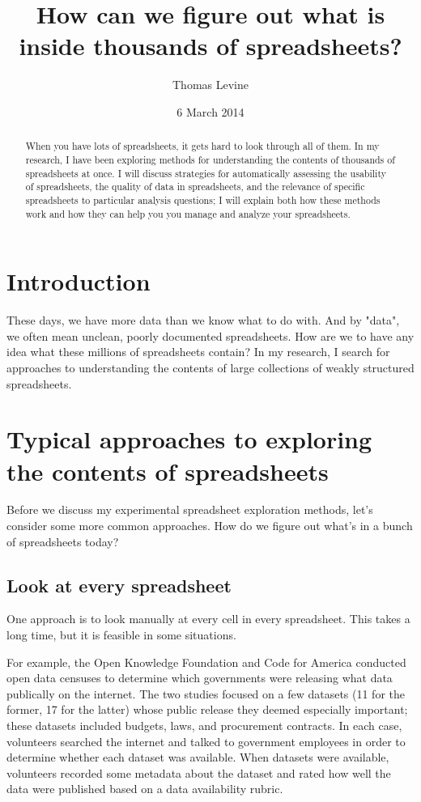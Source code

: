 \documentclass{acm_proc_article-sp}
\begin{document}
\title{How can we figure out what is inside thousands of spreadsheets?}
\author{ \alignauthor Thomas Levine\\  }
\date{6 March 2014}
\maketitle
\begin{abstract}
When you have lots of spreadsheets, it gets hard to look through all of them.
In my research, I have been exploring methods for understanding the contents
of thousands of spreadsheets at once. I will discuss strategies for automatically
assessing the usability of spreadsheets, the quality of data
in spreadsheets, and the relevance of specific spreadsheets to particular
analysis questions; I will explain both how these methods work and how they
can help you you manage and analyze your spreadsheets.
\end{abstract}


\section{Introduction}
These days, we have more data than we know what to do with. And by "data",
we often mean unclean, poorly documented spreadsheets. How are we to have
any idea what these millions of spreadsheets contain? In my research,
I search for approaches to understanding the contents of large collections
of weakly structured spreadsheets.

\section{Typical approaches to exploring the contents of spreadsheets}
Before we discuss my experimental spreadsheet exploration methods,
let's consider some more common approaches.
How do we figure out what's in a bunch of spreadsheets today?

\subsection{Look at every spreadsheet}
One approach is to look manually at every cell in every spreadsheet.
This takes a long time, but it is feasible in some situations.

For example, the Open Knowledge Foundation \cite{open-data-census}
and Code for America \cite{open-data-census-us}
conducted open data censuses to determine which governments were
releasing what data publically on the internet. The two studies
focused on a few datasets (11 for the former, 17 for the latter)
whose public release they deemed especially important; these datasets
included budgets, laws, and procurement contracts.
In each case, volunteers searched the internet and talked to
government employees in order to determine whether each dataset was
available. When datasets were available, volunteers recorded some
metadata about the dataset and rated how well the data were published
based on a data availability rubric.
\end{document}
